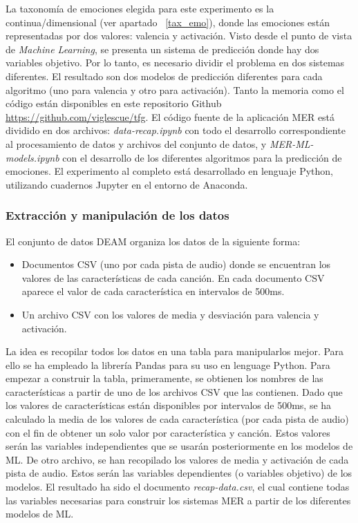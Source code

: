 \documentclass[12pt,a4paper,Spanish]{article}
\begin{document}
La taxonomía de emociones elegida para este experimento es la continua/dimensional (ver apartado ~\ref{tax_emo}), donde las emociones están representadas por dos valores: valencia y activación. Visto desde el punto de vista de \textit{Machine Learning}, se presenta un sistema de predicción donde hay dos variables objetivo. Por lo tanto, es necesario dividir el problema en dos sistemas diferentes. El resultado son dos modelos de predicción diferentes para cada algoritmo (uno para valencia y otro para activación).
\newline
Tanto la memoria como el código están disponibles en este repositorio Github \url{https://github.com/viglescue/tfg}. El código fuente de la aplicación MER está dividido en dos archivos: \textit{data-recap.ipynb} con todo el desarrollo correspondiente al procesamiento de datos y archivos del conjunto de datos, y \textit{MER-ML-models.ipynb} con el desarrollo de los diferentes algoritmos para la predicción de emociones. El experimento al completo está desarrollado en lenguaje Python, utilizando cuadernos Jupyter en el entorno de Anaconda. 







\subsubsection{Extracción y manipulación de los datos}
El conjunto de datos DEAM \cite{AlajankiEmoInMusicAnalysis} organiza los datos de la siguiente forma:
\begin{itemize}
	\item Documentos CSV (uno por cada pista de audio) donde se encuentran los valores de las características de cada canción. En cada documento CSV aparece el valor de cada característica en intervalos de 500ms.
	\item Un archivo CSV con los valores de media y desviación para valencia y activación.
\end{itemize}
La idea es recopilar todos los datos en una tabla para manipularlos mejor. Para ello se ha empleado la librería Pandas \cite{mckinney-proc-scipy-2010} para su uso en lenguage Python.
\newline
Para empezar a construir la tabla, primeramente, se obtienen los nombres de las características a partir de uno de los archivos CSV que las contienen. Dado que los valores de características están disponibles por intervalos de 500ms, se ha calculado la media de los valores de cada característica (por cada pista de audio) con el fin de obtener un solo valor por característica y canción. Estos valores serán las variables independientes que se usarán posteriormente en los modelos de ML.
\newline
De otro archivo, se han recopilado los valores de media y activación de cada pista de audio. Estos serán las variables dependientes (o variables objetivo) de los modelos.
\newline
El resultado ha sido el documento \textit{recap-data.csv}, el cual contiene todas las variables necesarias para construir los sistemas MER a partir de los diferentes modelos de ML.
\end{document}
